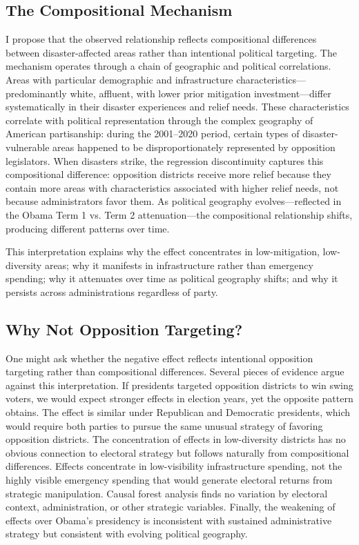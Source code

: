 \documentclass[12pt,letterpaper,oneside]{book}
\begin{document}
\subsection{The Compositional Mechanism}

I propose that the observed relationship reflects compositional differences between disaster-affected areas rather than intentional political targeting. The mechanism operates through a chain of geographic and political correlations. Areas with particular demographic and infrastructure characteristics---predominantly white, affluent, with lower prior mitigation investment---differ systematically in their disaster experiences and relief needs. These characteristics correlate with political representation through the complex geography of American partisanship: during the 2001--2020 period, certain types of disaster-vulnerable areas happened to be disproportionately represented by opposition legislators. When disasters strike, the regression discontinuity captures this compositional difference: opposition districts receive more relief because they contain more areas with characteristics associated with higher relief needs, not because administrators favor them. As political geography evolves---reflected in the Obama Term 1 vs. Term 2 attenuation---the compositional relationship shifts, producing different patterns over time.

This interpretation explains why the effect concentrates in low-mitigation, low-diversity areas; why it manifests in infrastructure rather than emergency spending; why it attenuates over time as political geography shifts; and why it persists across administrations regardless of party.

\subsection{Why Not Opposition Targeting?}

One might ask whether the negative effect reflects intentional opposition targeting rather than compositional differences. Several pieces of evidence argue against this interpretation. If presidents targeted opposition districts to win swing voters, we would expect stronger effects in election years, yet the opposite pattern obtains. The effect is similar under Republican and Democratic presidents, which would require both parties to pursue the same unusual strategy of favoring opposition districts. The concentration of effects in low-diversity districts has no obvious connection to electoral strategy but follows naturally from compositional differences. Effects concentrate in low-visibility infrastructure spending, not the highly visible emergency spending that would generate electoral returns from strategic manipulation. Causal forest analysis finds no variation by electoral context, administration, or other strategic variables. Finally, the weakening of effects over Obama's presidency is inconsistent with sustained administrative strategy but consistent with evolving political geography.
\end{document}
